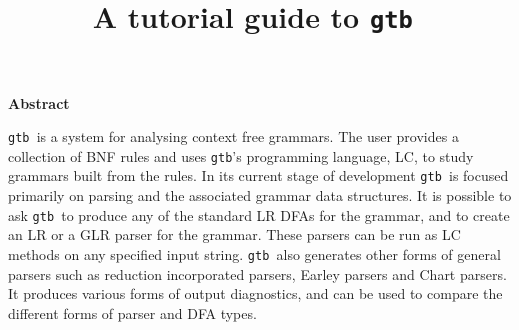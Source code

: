 
\newcommand{\derive}{{\mathop{\Rightarrow}\limits^*}}
\newcommand{\mderive}[1]{{\mathop{\Rightarrow}\limits^{#1}}}
\newcommand{\rmderive}[1]{{\mathop{\Rightarrow}\limits_{#1}}}
\newcommand{\mderives}[1]{{\ \mathop{\Rightarrow}\limits^{#1}\ }}
\newcommand{\pdn}{::=}

\newcommand{\miter}[4]{({#1})\kern 2pt_{#2}{\tt @}_{#3}\kern 2pt{{\tt #4}}}
\newcommand{\iter}[4]{({#1}){#2}{\tt @}{#3}{#4}}

\newcommand{\first}{\mbox{\sc first}}
\newcommand{\follow}{\mbox{\sc follow}}
\newcommand{\FIRST}{\mbox{\sc first}}
\newcommand{\FOLLOW}{\mbox{\sc follow}}

\newcommand{\red}{{\cal R}}
\newcommand{\epty}{\epsilon}
\newcommand{\rec}[1]{{#1}^{\perp}}

\newcommand{\rdpsupp}{{\mediumseries\tt rdp\_supp}}
\newcommand{\rdp}{{\mediumseries\tt rdp}}
\newcommand{\gtb}{{\mediumseries\tt gtb\ }}
\newcommand{\gtbs}{{\mediumseries\tt gtb}}
\newcommand{\rdps}{{\mediumseries\tt rdp\ }}

\newcommand{\mypage}[1]{\hspace*{\fill}p\pageref{#1} }

\newcommand{\lj}{\hspace*{\fill}}

\newtheorem{thm}{Theorem}
\newtheorem{prop}{Proposition}
\newtheorem{cor}{Corollary}

\title{A tutorial guide to \gtb}



\thispagestyle{empty}
\vspace*{1cm}
\begin{center}{\bf Abstract}\end{center}

\gtb is a system for analysing context free grammars. The user
provides a collection of BNF rules and uses \gtbs's programming
language, LC, to
study grammars built from the rules. In its current stage of
development \gtb is focused primarily on parsing and the associated
grammar data structures. It is 
possible to ask \gtb to produce any of the standard LR DFAs for the
grammar, and to create an LR or a GLR parser for the grammar.
These parsers can be run as LC methods on any specified
input string. \gtb also generates other forms of general parsers such
as reduction incorporated parsers, Earley parsers and Chart parsers.
It produces various forms of output diagnostics, and can be used to
compare the different forms of parser and DFA types.

